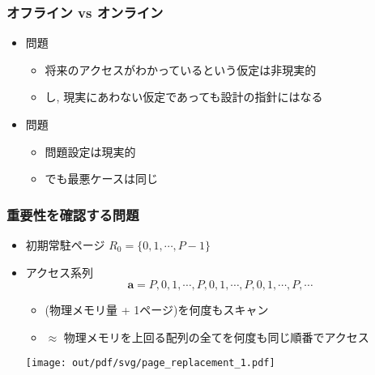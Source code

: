 \documentclass[12pt,dvipdfmx]{beamer}
\begin{document}
\begin{frame}
  \frametitle{オフライン vs オンライン}
  \begin{itemize}
  \item {}問題
    \begin{itemize}
    \item 将来のアクセスがわかっているという仮定は非現実的
    \item {}し, 現実にあわない仮定であっても設計の指針にはなる
    \end{itemize}
  \item {}問題
    \begin{itemize}
    \item 問題設定は現実的
    \item {}でも最悪ケースは同じ
    \end{itemize}
  \end{itemize}

  \begin{center}
    \def\svgwidth{0.8\textwidth}
    {\tiny}
  \end{center}
\end{frame}

\begin{frame}
  \frametitle{重要性を確認する問題}
  \begin{itemize}
  \item 初期常駐ページ $R_0 = \{0, 1, \cdots , P-1\}$ 
  \item アクセス系列
    \[ {\mathbf a} = P, 0, 1, \cdots , P, 0, 1, \cdots, P, 0, 1, \cdots, P, \cdots \]
    \begin{itemize}
    \item (物理メモリ量 + 1ページ)を何度もスキャン
      
    \item $\approx$ 物理メモリを上回る配列の全てを何度も同じ順番でアクセス
    \end{itemize}

    \begin{center}
      \texttt{[image: out/pdf/svg/page\_replacement\_1.pdf]}
    \end{center}
  \end{itemize}
\end{frame}
\end{document}
